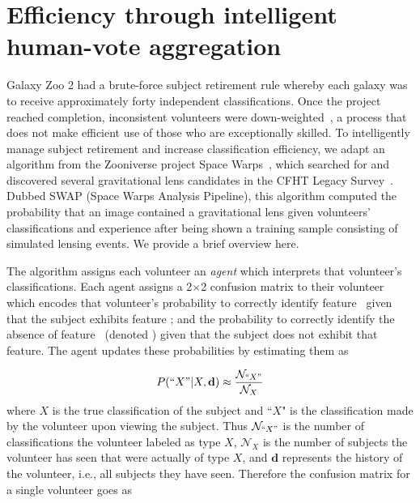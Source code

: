 \section{Efficiency through intelligent human-vote aggregation}\label{chap3: SWAP}

Galaxy Zoo 2 had a brute-force subject retirement rule whereby each galaxy was to receive approximately forty independent classifications.  Once the project reached completion, inconsistent volunteers were down-weighted~\citep{Willett2013}, a process that does not make efficient use of those who are exceptionally skilled. To intelligently manage subject retirement and increase classification efficiency, we adapt an algorithm from the Zooniverse project Space Warps~\citep{Marshall2016}, which searched for and discovered several gravitational lens candidates in the CFHT Legacy Survey~\citep{More2016}.  Dubbed SWAP (Space Warps Analysis Pipeline), this algorithm computed the probability that an image contained a gravitational lens given volunteers' classifications and experience after being shown a training sample consisting of simulated lensing events.  We provide a brief overview here.  

The algorithm assigns each volunteer an \textit{agent} which interprets that volunteer's classifications. Each agent assigns a 2$\times$2 confusion matrix to their volunteer which encodes that volunteer's probability to correctly identify feature \A~given that the subject exhibits feature \A; and the probability to correctly identify the absence of feature \A~(denoted \N) given that the subject does not exhibit that feature. The agent updates these probabilities by estimating them as 

\begin{equation}
P(``X" | X, \mathbf{d}) \approx \frac{\mathcal{N}_{``X"}}{\mathcal{N}_{X}}
\end{equation}
where $X$ is the true classification of the subject and ``$X$" is the  classification made by the volunteer upon viewing the subject. Thus $\mathcal{N}_{``X"}$ is the number of classifications the volunteer labeled as type $X$, $\mathcal{N}_X$ is the number of subjects the volunteer has seen that were actually of type $X$, and $\mathbf{d}$ represents the history of the volunteer, i.e., all subjects they have seen. Therefore the confusion matrix for a single volunteer goes as

